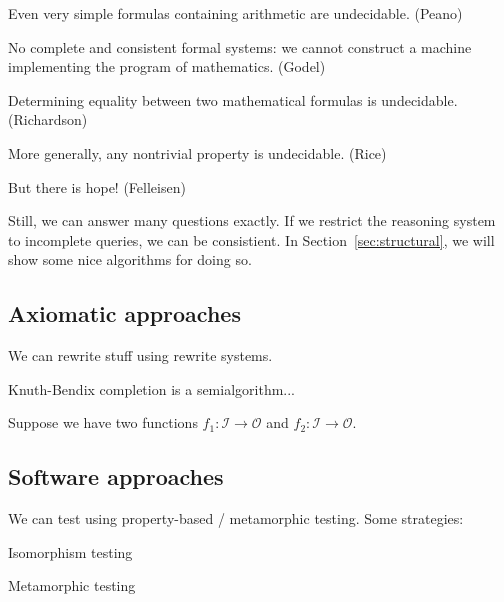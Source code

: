 \documentclass[11pt]{article}
\begin{document}
    Even very simple formulas containing arithmetic are undecidable. (Peano)

    No complete and consistent formal systems: we cannot construct a machine implementing the program of mathematics. (Godel)

    Determining equality between two mathematical formulas is undecidable. (Richardson)

    More generally, any nontrivial property is undecidable. (Rice)

    But there is hope! (Felleisen)


    Still, we can answer many questions exactly. If we restrict the reasoning system to incomplete queries, we can be consistient. In Section~\ref{sec:structural}, we will show some nice algorithms for doing so.

%
%

    \subsection{Axiomatic approaches}

    We can rewrite stuff using rewrite systems.

    Knuth-Bendix completion is a semialgorithm...

    Suppose we have two functions $f_1: \mathcal{I} \rightarrow \mathcal{O}$ and $f_2: \mathcal{I}\rightarrow \mathcal{O}$.


    \subsection{Software approaches}

    We can test using property-based / metamorphic testing. Some strategies:

    Isomorphism testing

    Metamorphic testing
\end{document}
